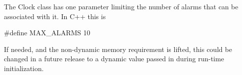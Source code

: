 
The Clock class has one parameter limiting the number of alarms that can be
associated with it.  In C++ this is

        \#define MAX\_ALARMS 10

If needed, and the non-dynamic memory requirement is lifted, this could be
changed in a future release to a dynamic value passed in during run-time
initialization.
